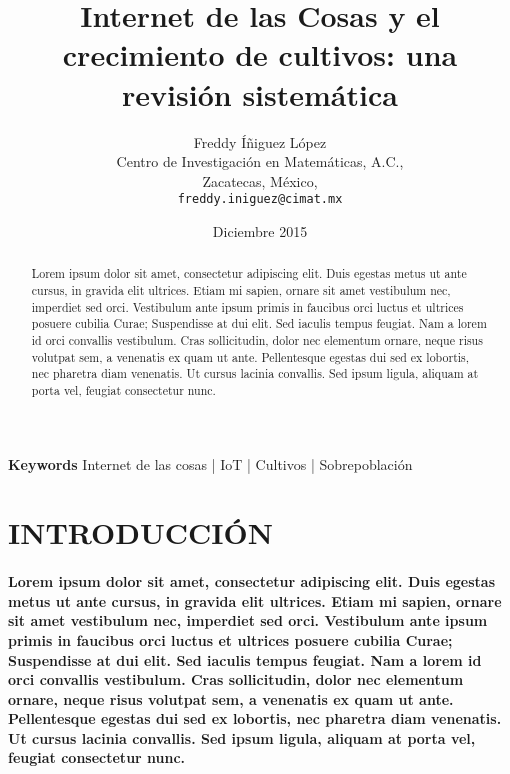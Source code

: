 \documentclass[10pt, twocolumn]{article}
\begin{document}
\title{\textbf{Internet de las Cosas y el crecimiento de cultivos: una revisión sistemática}}
\author{Freddy Íñiguez López\\
	Centro de Investigación en Matemáticas, A.C.,\\
	Zacatecas, México,\\
	\texttt{freddy.iniguez@cimat.mx}}
\date{Diciembre 2015}
\maketitle

\begin{abstract}
Lorem ipsum dolor sit amet, consectetur adipiscing elit. Duis egestas metus ut ante cursus, in gravida elit ultrices. Etiam mi sapien, ornare sit amet vestibulum nec, imperdiet sed orci. Vestibulum ante ipsum primis in faucibus orci luctus et ultrices posuere cubilia Curae; Suspendisse at dui elit. Sed iaculis tempus feugiat. Nam a lorem id orci convallis vestibulum. Cras sollicitudin, dolor nec elementum ornare, neque risus volutpat sem, a venenatis ex quam ut ante. Pellentesque egestas dui sed ex lobortis, nec pharetra diam venenatis. Ut cursus lacinia convallis. Sed ipsum ligula, aliquam at porta vel, feugiat consectetur nunc.
\end{abstract}

\paragraph{  }
\textbf{Keywords} Internet de las cosas | IoT | Cultivos | Sobrepoblación

\section{INTRODUCCIÓN}
\paragraph{Lorem ipsum dolor sit amet, consectetur adipiscing elit. Duis egestas metus ut ante cursus, in gravida elit ultrices. Etiam mi sapien, ornare sit amet vestibulum nec, imperdiet sed orci. Vestibulum ante ipsum primis in faucibus orci luctus et ultrices posuere cubilia Curae; Suspendisse at dui elit. Sed iaculis tempus feugiat. Nam a lorem id orci convallis vestibulum. Cras sollicitudin, dolor nec elementum ornare, neque risus volutpat sem, a venenatis ex quam ut ante. Pellentesque egestas dui sed ex lobortis, nec pharetra diam venenatis. Ut cursus lacinia convallis. Sed ipsum ligula, aliquam at porta vel, feugiat consectetur nunc.}
\end{document}
